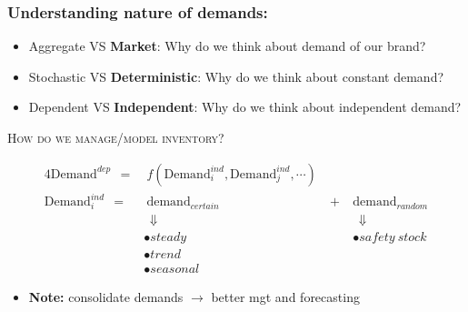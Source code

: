 \documentclass[10pt,handout,notes=show]{beamer}
\begin{document}
\begin{frame}
  \frametitle{Understanding nature of demands:}

  \begin{itemize}
    \item Aggregate VS \textbf{Market}: Why do we think about demand of \alert{our brand}?
    \item Stochastic VS  \textbf{Deterministic}: Why do we think about \alert{constant} demand?
    \item Dependent VS \textbf{Independent}: Why do we think about \alert{independent} demand?
  \end{itemize}

  \NextLine
  \textsc{How do we manage/model inventory?  }
  \begin{center}\small{
  \begin{alignat*}{4}
    \mbox{Demand}^{dep}~~=& ~f(\mbox{Demand}^{ind}_i,\mbox{Demand}^{ind}_j,\cdots) \\
    \mbox{Demand}^{ind}_i~~=&  ~\mbox{demand}_{certain} ~~ &~+~&  \mbox{demand}_{random} \\
                    &  ~~\Downarrow             ~~&~~~&  ~~ \Downarrow \\
                    &  \bullet steady          ~~ &~~~&  \bullet safety~stock \\
                    &  \bullet trend \\
                    &  \bullet seasonal
  \end{alignat*}}
  \end{center}

  \begin{itemize}
    \item[] \textbf{Note:} consolidate demands $\rightarrow$ better mgt and forecasting  \hfill \hyperlink{postpone}{}
  \end{itemize}


\end{frame}
\end{document}
